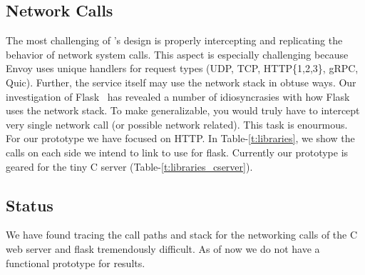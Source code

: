 \begin{table}[!ht]
    \begin{center}
        \caption{Library Functions Linked (Tiny C Webserver only)}
        \label{t:libraries_cserver}
    \end{center}
\end{table}

\subsection{\sysname Network Calls}
The most challenging of \sysname's design is properly intercepting and replicating the behavior of network system calls.
This aspect is especially challenging because Envoy uses unique handlers for request types (UDP, TCP, HTTP\{1,2,3\}, gRPC, Quic).
Further, the service itself may use the network stack in obtuse ways.
Our investigation of Flask~\cite{flask} has revealed a number of idiosyncrasies with how Flask uses the network stack.
To make \sysname generalizable, you would truly have to intercept very single network call (or possible network related).
This task is enourmous.
For our prototype we have focused on HTTP.
In Table-\ref{t:libraries}, we show the calls on each side we intend to link to use \sysname for flask.
Currently our prototype is geared for the tiny C server (Table-\ref{t:libraries_cserver}).


\subsection{\sysname Status}
We have found tracing the call paths and stack for the networking calls of the C web server and flask tremendously difficult.
As of now we do not have a functional prototype for results.

